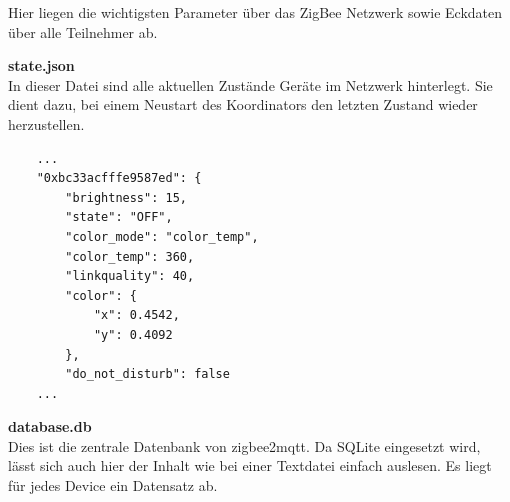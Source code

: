   Hier liegen die wichtigsten Parameter über das ZigBee Netzwerk sowie Eckdaten über alle Teilnehmer ab.

  \textbf{state.json}\\

  In dieser Datei sind alle aktuellen Zustände Geräte im Netzwerk hinterlegt. Sie dient dazu, bei einem Neustart des Koordinators den letzten Zustand wieder herzustellen.

  \begin{lstlisting}
    ...
    "0xbc33acfffe9587ed": {
        "brightness": 15,
        "state": "OFF",
        "color_mode": "color_temp",
        "color_temp": 360,
        "linkquality": 40,
        "color": {
            "x": 0.4542,
            "y": 0.4092
        },
        "do_not_disturb": false
    ...
  \end{lstlisting}
  \textbf{database.db}\\

  Dies ist die zentrale Datenbank von zigbee2mqtt. Da SQLite eingesetzt wird, lässt sich auch hier der Inhalt wie bei einer Textdatei einfach auslesen.
  Es liegt für jedes Device ein Datensatz ab.

